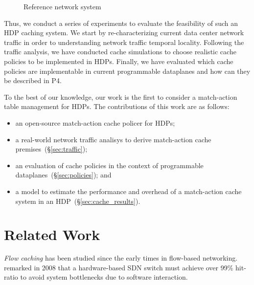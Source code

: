 \begin{figure}[]
	\centering
	
	\caption{Reference network system}
	\label{fig:high_level_network}
\end{figure}


Thus, we conduct a series of experiments to evaluate the feasibility of such an HDP caching system.
We start by re-characterizing current data center network traffic in order to understanding network traffic temporal locality.
Following the traffic analysis, we have conducted cache simulations to choose realistic cache policies to be implemented in HDPs.
Finally, we have evaluated which cache policies are implementable in current programmable dataplanes and how can they be described in P4.

To the best of our knowledge, our work is the first to consider a match-action  table management for HDPs.
The contributions of this work are as follows: 

\begin{itemize}[noitemsep,topsep=0pt]
	\item an open-source match-action cache policer for HDPs;
	\item a real-world network traffic analisys to derive match-action cache premises~(\S\ref{sec:traffic});
	\item an evaluation of cache policies in the context of programmable dataplanes~(\S\ref{sec:policies}); and
	\item a model to estimate the performance and overhead of a match-action cache system in an HDP~(\S\ref{sec:cache_results}).
\end{itemize}

\section{Related Work}\label{sec:related_works}

\textit{Flow caching} has been studied since the early times in flow-based networking.
\citeauthor{casado:2008}~\cite{casado:2008} remarked in 2008 that a hardware-based SDN switch must achieve over 99\% hit-ratio to avoid system bottlenecks due to software interaction.

